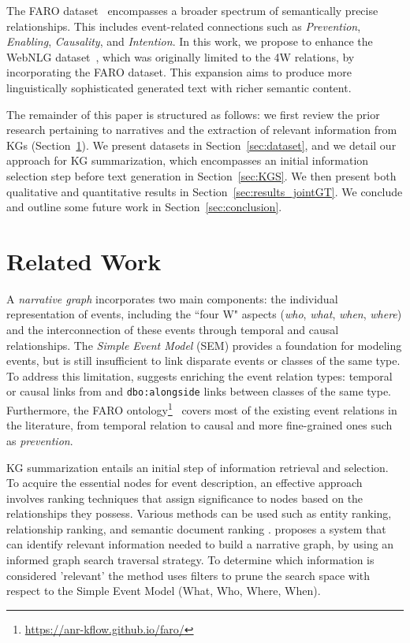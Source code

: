 \documentclass[
hf, %
]{ceurart}
\begin{document}
The FARO dataset~\cite{beyond_causality,sem_data_aug} encompasses a broader spectrum of semantically precise relationships. This includes event-related connections such as \textit{Prevention}, \textit{Enabling}, \textit{Causality}, and \textit{Intention}. In this work, we propose to enhance the WebNLG dataset~\cite{gardent-etal-2017-creating}, which was originally limited to the 4W relations, by incorporating the FARO dataset. This expansion aims to produce more linguistically sophisticated generated text with richer semantic content.

The remainder of this paper is structured as follows: we first review the prior research pertaining to narratives and the extraction of relevant information from KGs (Section~\ref{sec:related-work}). We present datasets in Section~\ref{sec:dataset}, and we detail our approach for KG summarization, which encompasses an initial information selection step before text generation in Section~\ref{sec:KGS}. We then present both qualitative and quantitative results in Section~\ref{sec:results_jointGT}. We conclude and outline some future work in Section~\ref{sec:conclusion}.

\section{Related Work }
\label{sec:related-work}
A \textit{narrative graph} \cite{Build_narrative} incorporates two main components: the individual representation of events, including the ``four W" aspects (\textit{who}, \textit{what}, \textit{when}, \textit{where}) and the interconnection of these events through temporal and causal relationships. The \textit{Simple Event Model} (SEM) \cite{SEM} provides a foundation for modeling events, but is still insufficient to link disparate events or classes of the same type. To address this limitation, \citeauthor{Build_narrative} \cite{Build_narrative} suggests enriching the event relation types: temporal or causal links from \citeauthor{allen} \cite{allen} and \texttt{dbo:alongside} links between classes of the same type. Furthermore, the FARO ontology\footnote{\url{https://anr-kflow.github.io/faro/}}~\cite{beyond_causality} covers most of the existing event relations in the literature, from temporal relation to causal and more fine-grained ones such as \textit{prevention}.

KG summarization entails an initial step of information retrieval and selection. To acquire the essential nodes for event description, an effective approach involves ranking techniques that assign significance to nodes based on the relationships they possess. Various methods can be used such as entity ranking, relationship ranking, and semantic document ranking \cite{JINDAL2014416}. \cite{graph_traversal} proposes a system that can identify relevant information needed to build a narrative graph, by using an informed graph search traversal strategy. To determine which information is considered 'relevant' the method uses filters to prune the search space with respect to the Simple Event Model (What, Who, Where, When).
\end{document}
